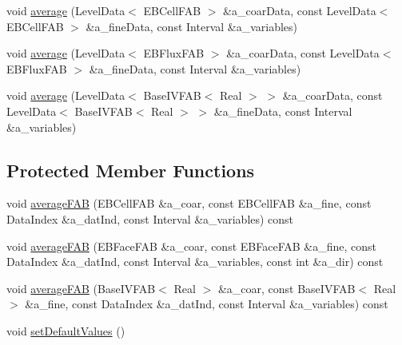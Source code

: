 \begin{DoxyCompactItemize}
\item 
void \hyperlink{classebcoarseaverage_aad6c03f62bb8b6472e4b096485fb81d0}{average} (Level\+Data$<$ E\+B\+Cell\+F\+AB $>$ \&a\+\_\+coar\+Data, const Level\+Data$<$ E\+B\+Cell\+F\+AB $>$ \&a\+\_\+fine\+Data, const Interval \&a\+\_\+variables)
\item 
void \hyperlink{classebcoarseaverage_a6fc2e9d81edcf8f259a7322ed5d55a92}{average} (Level\+Data$<$ E\+B\+Flux\+F\+AB $>$ \&a\+\_\+coar\+Data, const Level\+Data$<$ E\+B\+Flux\+F\+AB $>$ \&a\+\_\+fine\+Data, const Interval \&a\+\_\+variables)
\item 
void \hyperlink{classebcoarseaverage_ac1fa3fe078ac28419ca6c411f17f504e}{average} (Level\+Data$<$ Base\+I\+V\+F\+AB$<$ Real $>$ $>$ \&a\+\_\+coar\+Data, const Level\+Data$<$ Base\+I\+V\+F\+AB$<$ Real $>$ $>$ \&a\+\_\+fine\+Data, const Interval \&a\+\_\+variables)
\end{DoxyCompactItemize}
\subsection*{Protected Member Functions}
\begin{DoxyCompactItemize}
\item 
void \hyperlink{classebcoarseaverage_a22eb7a4058ce8760cede7edfee2cf784}{average\+F\+AB} (E\+B\+Cell\+F\+AB \&a\+\_\+coar, const E\+B\+Cell\+F\+AB \&a\+\_\+fine, const Data\+Index \&a\+\_\+dat\+Ind, const Interval \&a\+\_\+variables) const 
\item 
void \hyperlink{classebcoarseaverage_a79dcdba12abe46e813bb1b7c8566b956}{average\+F\+AB} (E\+B\+Face\+F\+AB \&a\+\_\+coar, const E\+B\+Face\+F\+AB \&a\+\_\+fine, const Data\+Index \&a\+\_\+dat\+Ind, const Interval \&a\+\_\+variables, const int \&a\+\_\+dir) const 
\item 
void \hyperlink{classebcoarseaverage_af608292f8deccf5a15e362780fdeed08}{average\+F\+AB} (Base\+I\+V\+F\+AB$<$ Real $>$ \&a\+\_\+coar, const Base\+I\+V\+F\+AB$<$ Real $>$ \&a\+\_\+fine, const Data\+Index \&a\+\_\+dat\+Ind, const Interval \&a\+\_\+variables) const 
\item 
void \hyperlink{classebcoarseaverage_a260863f7d3f08799bdd2c7257098d1d1}{set\+Default\+Values} ()
\end{DoxyCompactItemize}
